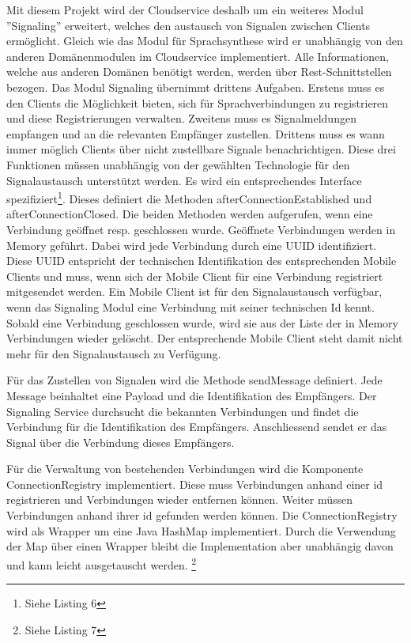 Mit diesem Projekt wird der Cloudservice deshalb um ein weiteres Modul ''Signaling'' erweitert, welches den austausch von Signalen zwischen Clients ermöglicht.
Gleich wie das Modul für Sprachsynthese wird er unabhängig von den anderen Domänenmodulen im Cloudservice implementiert.
Alle Informationen, welche aus anderen Domänen benötigt werden, werden über Rest-Schnittstellen bezogen.
Das Modul Signaling übernimmt drittens Aufgaben.
Erstens muss es den Clients die Möglichkeit bieten, sich für Sprachverbindungen zu registrieren und diese Registrierungen verwalten.
Zweitens muss es Signalmeldungen empfangen und an die relevanten Empfänger zustellen.
Drittens muss es wann immer möglich Clients über nicht zustellbare Signale benachrichtigen.
Diese drei Funktionen müssen unabhängig von der gewählten Technologie für den Signalaustausch unterstützt werden.
Es wird ein entsprechendes Interface spezifiziert\footnote{Siehe Listing 6}.
Dieses definiert die Methoden afterConnectionEstablished und afterConnectionClosed.
Die beiden Methoden werden aufgerufen, wenn eine Verbindung geöffnet resp. geschlossen wurde.
Geöffnete Verbindungen werden in Memory geführt.
Dabei wird jede Verbindung durch eine UUID identifiziert.
Diese UUID entspricht der technischen Identifikation des entsprechenden Mobile Clients und muss, wenn sich der Mobile Client für eine Verbindung registriert mitgesendet werden.
Ein Mobile Client ist für den Signalaustausch verfügbar, wenn das Signaling Modul eine Verbindung mit seiner technischen Id kennt.
Sobald eine Verbindung geschlossen wurde, wird sie aus der Liste der in Memory Verbindungen wieder gelöscht.
Der entsprechende Mobile Client steht damit nicht mehr für den Signalaustausch zu Verfügung.

Für das Zustellen von Signalen wird die Methode sendMessage definiert.
Jede Message beinhaltet eine Payload und die Identifikation des Empfängers.
Der Signaling Service durchsucht die bekannten Verbindungen und findet die Verbindung für die Identifikation des Empfängers.
Anschliessend sendet er das Signal über die Verbindung dieses Empfängers.

Für die Verwaltung von bestehenden Verbindungen wird die Komponente ConnectionRegistry implementiert.
Diese muss Verbindungen anhand einer id registrieren und Verbindungen wieder entfernen können.
Weiter müssen Verbindungen anhand ihrer id gefunden werden können.
Die ConnectionRegistry wird als Wrapper um eine Java HashMap implementiert.
Durch die Verwendung der Map über einen Wrapper bleibt die Implementation aber unabhängig davon und kann leicht ausgetauscht werden. \footnote{Siehe Listing 7}

